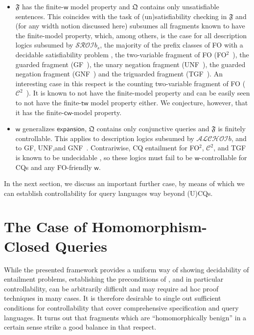 \documentclass[10pt,a4paper]{amsart}
\theoremstyle{definition}
\numberwithin{equation}{section}
\theoremstyle{plain}
\theoremstyle{definition}
\theoremstyle{myexample}
\theoremstyle{plain}
\theoremstyle{definition}
\newcommand{\fcn}[1]{\mathsf{#1}}
\begin{document}
\begin{itemize}
\item $\mathfrak{F}$ has the finite-$\fcn{w}$ model property and $\mathfrak{Q}$ contains only unsatisfiable sentences. This coincides with the task of (un)satisfiability checking in $\mathfrak{F}$ and (for any width notion discussed here) subsumes all fragments known to have the finite-model property, which, among others, is the case for 
all description logics subsumed by $\mathcal{SROI}b_s$,
the majority of the prefix classes of FO with a decidable satisfiability problem \cite{BorgerGG1997}, 
the two-variable fragment of FO (FO$^2$~\cite{Mortimer75,GradelKV97}),  
the guarded fragment (GF~\cite{AndrekaNB98,Gradel99}), 
the unary negation fragment (UNF~\cite{SegoufinC13}), 
the guarded negation fragment (GNF~\cite{GuardedNegation})
and the triguarded fragment (TGF~\cite{RudolphS18,KieronskiR21}). 
An interesting case in this respect is the counting two-variable fragment of FO ($\mathcal{C}^2$~\cite{GradelOR97}). It is known to not have the finite-model property and can be easily seen to not have the finite-$\fcn{tw}$ model property either. We conjecture, however, that it has the finite-$\fcn{cw}$-model property. 
\item $\fcn{w}$ generalizes $\fcn{expansion}$,  $\mathfrak{Q}$ contains only conjunctive queries and $\mathfrak{F}$ is finitely controllable. This applies to description logics subsumed by $\mathcal{ALCHOI}b$, and to GF, UNF,\linebreak and GNF~\cite{BaranyGO13}. Contrariwise, CQ entailment for FO$^2$\!, $\mathcal{C}^2$\!, and TGF is known to be undecidable \cite{Rosati07}, so these logics must fail to be $\fcn{w}$-controllable for CQs and any FO-friendly $\fcn{w}$.       
\end{itemize}
%
In the next section, we discuss an important further case, by means of which we can establish controllability for query languages way beyond (U)CQs.   

\section{The Case of Homomorphism-Closed Queries}\label{sec:homclosedqueries}

While the presented framework provides a uniform way of showing decidability of entailment problems, establishing the preconditions of , and in particular controllability, can be arbitrarily difficult and may require ad hoc proof techniques in many cases.
It is therefore desirable to single out sufficient conditions for controllability that cover comprehensive specification and query languages. It turns out that fragments which are ``homomorphically benign'' in a certain sense strike a good balance in that respect.
\end{document}
